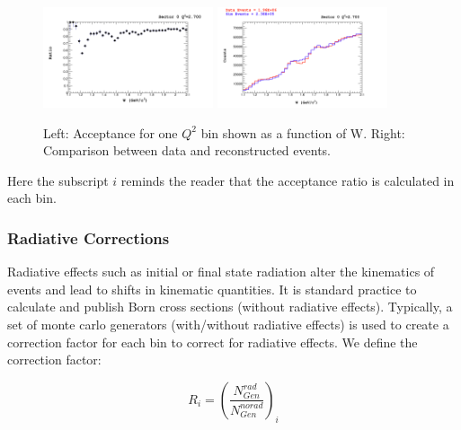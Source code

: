 \begin{figure}
  \centering
  \includegraphics[width=5cm]{image/acceptanceSector0Slice4.png}
  \includegraphics[width=5cm]{image/compareDataSimSector0Slice4.png}
  \caption{Left: Acceptance for one $Q^{2}$ bin shown as a function of W.  Right: Comparison between data and reconstructed events. }
  \label{fig:acceptance}
\end{figure}

Here the subscript $i$ reminds the reader that the acceptance ratio is calculated in each bin.  

\subsubsection{Radiative Corrections}

Radiative effects such as initial or final state radiation alter the kinematics of events and lead to shifts in kinematic quantities.  It is standard practice to calculate and publish Born cross sections (without radiative effects).  Typically, a set of monte carlo generators (with/without radiative effects) is used to create a correction factor for each bin to correct for radiative effects.  We define the correction factor:

\begin{equation}
  R_{i} = \left( \frac{N_{Gen}^{rad}}{N_{Gen}^{norad}} \right)_{i}
\end{equation}

